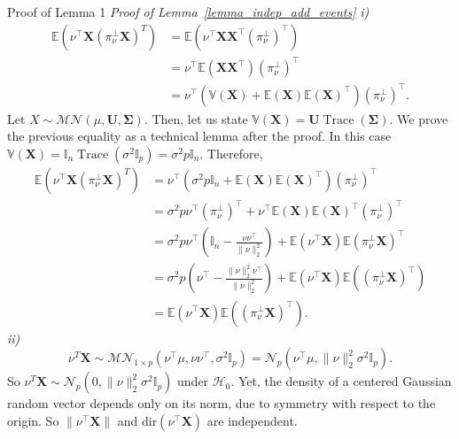 \documentclass{beamer}
\newcommand{\projnu}{\pi_{\nu}^{\perp}}
\begin{document}
\begin{frame}[allowframebreaks]{Proof of Lemma 1}
  \textit{Proof of Lemma~\ref{lemma_indep_add_events}}
    \textit{i)}
    \begin{equation*}
      \begin{aligned}
        \mathbb{E}(\nu^\top\mathbf{X} (\projnu \mathbf{X})^T)
        &= \mathbb{E}(\nu^\top \mathbf{X} \mathbf{X}^\top (\projnu)^\top) \\
        &= \nu^\top \mathbb{E}(\mathbf{X}\mathbf{X}^\top)(\projnu)^\top \\
        &= \nu^\top(\mathbb{V}(\mathbf{X})+\mathbb{E}(\mathbf{X})\mathbb{E}(\mathbf{X})^\top)(\projnu)^\top.
      \end{aligned}
    \end{equation*}
    Let $X \sim \mathcal{MN}(\mu, \mathbf{U}, \mathbf{\Sigma})$. Then, let us state $\mathbb{V}(\mathbf{X}) = \mathbf{U} \operatorname{Trace}(\mathbf{\Sigma})$. We prove the previous equality as a technical lemma after the proof.
    In this case $\mathbb{V}(\mathbf{X}) = \mathbb{I}_n \operatorname{Trace}(\sigma^2\mathbb{I}_p) = \sigma^2 p \mathbb{I}_n$. Therefore,
    \begin{equation*}
      \begin{aligned}
        \mathbb{E}(\nu^\top\mathbf{X} (\projnu \mathbf{X})^T)
        &= \nu^\top(\sigma^2p\mathbb{I}_n + \mathbb{E}(\mathbf{X})\mathbb{E}(\mathbf{X})^\top)(\projnu)^\top \\
        &= \sigma^2 p \nu^\top(\projnu)^\top + \nu^\top \mathbb{E}(\mathbf{X})\mathbb{E}(\mathbf{X})^\top(\projnu)^\top \\
        &= \sigma^2 p \nu^\top(\mathbb{I}_n - \frac{\nu \nu^\top}{\|\nu\|_2^2}) + \mathbb{E}(\nu^\top \mathbf{X})\mathbb{E}(\projnu \mathbf{X})^\top \\
        &= \sigma^2 p (\nu^\top - \frac{\|\nu\|_2^2\nu^\top}{\|\nu\|_2^2}) + \mathbb{E}(\nu^\top \mathbf{X})\mathbb{E}((\projnu \mathbf{X})^\top) \\
        &= \mathbb{E}(\nu^\top \mathbf{X})\mathbb{E}((\projnu \mathbf{X})^\top).
      \end{aligned}
    \end{equation*}
    \textit{ii)}
    \begin{equation*}
      \nu^T \mathbf{X} \sim \mathcal{MN}_{1 \times p}(\nu^\top\mu, \nu \nu^\top, \sigma^2\mathbb{I}_p) = \mathcal{N}_p(\nu^\top \mu,\|\nu\|_2^2\sigma^2 \mathbb{I}_p).
    \end{equation*}
    So $\nu^T \mathbf{X} \sim \mathcal{N}_p(0,\|\nu\|_2^2\sigma^2\mathbb{I}_p)$ under $\mathcal{H}_0$.
    Yet, the density of a centered Gaussian random vector depends only on its norm, due to symmetry with respect to the origin. So $\|\nu^\top \mathbf{X}\|$ and $\text{dir}(\nu^\top\mathbf{X})$ are independent.
\end{frame}
\end{document}
